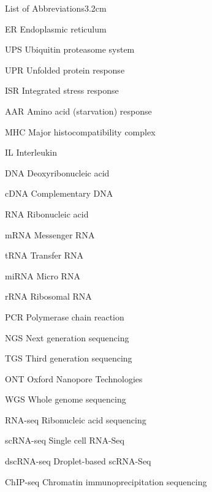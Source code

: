 \begin{mclistof}{List of Abbreviations}{3.2cm}
\item[ER] Endoplasmic reticulum

\item[UPS] Ubiquitin proteasome system

\item[UPR] Unfolded protein response

\item[ISR] Integrated stress response

\item[AAR] Amino acid (starvation) response

\item[MHC] Major histocompatibility complex

\item[IL] Interleukin

\item[DNA] Deoxyribonucleic acid

\item[cDNA] Complementary DNA

\item[RNA] Ribonucleic acid

\item[mRNA] Messenger RNA

\item[tRNA] Transfer RNA

\item[miRNA] Micro RNA

\item[rRNA] Ribosomal RNA

\item[PCR] Polymerase chain reaction

\item[NGS] Next generation sequencing

\item[TGS] Third generation sequencing

\item[ONT] Oxford Nanopore Technologies

\item[WGS] Whole genome sequencing

\item[RNA-seq] Ribonucleic acid sequencing

\item[scRNA-seq] Single cell RNA-Seq

\item[dscRNA-seq] Droplet-based scRNA-Seq

\item[ChIP-seq] Chromatin immunoprecipitation sequencing


\end{mclistof}
